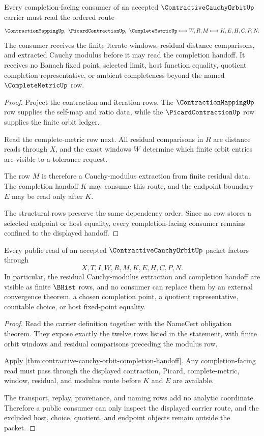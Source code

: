 \begin{theorem}
\label{thm:contractive-cauchy-orbit-completion-handoff}
Every completion-facing consumer of an accepted $\ContractiveCauchyOrbitUp$ carrier must read the ordered route
$$
\ContractionMappingUp,\ \PicardContractionUp,\ \CompleteMetricUp
\longmapsto
W,R,M
\longmapsto
K,E,H,C,P,N .
$$
The consumer receives the finite iterate windows, residual-distance comparisons, and extracted Cauchy modulus before it may read the completion handoff. It receives no Banach fixed point, selected limit, host function equality, quotient completion representative, or ambient completeness beyond the named $\CompleteMetricUp$ row.
\end{theorem}
\begin{proof}
Project the contraction and iteration rows. The $\ContractionMappingUp$ row supplies the self-map and ratio data, while the $\PicardContractionUp$ row supplies the finite orbit ledger.

Read the complete-metric row next. All residual comparisons in $R$ are distance reads through $X$, and the exact windows $W$ determine which finite orbit entries are visible to a tolerance request.

The row $M$ is therefore a Cauchy-modulus extraction from finite residual data. The completion handoff $K$ may consume this route, and the endpoint boundary $E$ may be read only after $K$.

The structural rows preserve the same dependency order. Since no row stores a selected endpoint or host equality, every completion-facing consumer remains confined to the displayed handoff.
\end{proof}

\begin{theorem}
\label{thm:contractive-cauchy-orbit-ledger-non-escape}
Every public read of an accepted $\ContractiveCauchyOrbitUp$ packet factors through
$$
X,T,I,W,R,M,K,E,H,C,P,N .
$$
In particular, the residual Cauchy-modulus extraction and completion handoff are visible as finite $\BHist$ rows, and no consumer can replace them by an external convergence theorem, a chosen completion point, a quotient representative, countable choice, or host fixed-point equality.
\end{theorem}
\begin{proof}
Read the carrier definition together with the NameCert obligation theorem. They expose exactly the twelve rows listed in the statement, with finite orbit windows and residual comparisons preceding the modulus row.

Apply \autoref{thm:contractive-cauchy-orbit-completion-handoff}. Any completion-facing read must pass through the displayed contraction, Picard, complete-metric, window, residual, and modulus route before $K$ and $E$ are available.

The transport, replay, provenance, and naming rows add no analytic coordinate. Therefore a public consumer can only inspect the displayed carrier route, and the excluded host, choice, quotient, and endpoint objects remain outside the packet.
\end{proof}

